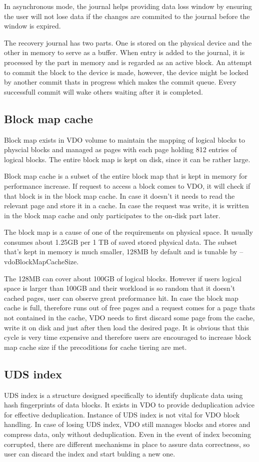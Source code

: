 \documentclass[
  color, %
  table, %
  lof,   %
  lot,   %
]{fithesis3}
\begin{document}
In asynchronous mode, the journal helps providing data loss window by ensuring the user will not lose data if the changes are commited to the journal before the window is expired.

The recovery journal has two parts. One is stored on the physical device and the other in memory to serve as a buffer. When entry is added to the journal, it is processed by the part in memory and is regarded as an active block. An attempt to commit the block to the device is made, however, the device might be locked by another commit thats in progress which makes the commit queue. Every successfull commit will wake others waiting after it is completed.


\subsection{Block map cache}
Block map exists in VDO volume to maintain the mapping of logical blocks to physcial blocks and managed as pages with each page holding 812 entries of logical blocks. The entire block map is kept on disk, since it can be rather large.

Block map cache is a subset of the entire block map that is kept in memory for performance increase. If request to access a block comes to VDO, it will check if that block is in the block map cache. In case it doesn't it needs to read the relevant page and store it in a cache. In case the request was write, it is written in the block map cache and only participates to the on-disk part later.

The block map is a cause of one of the requirements on physical space. It usually consumes about 1.25GB per 1 TB of saved stored physical data. The subset that's kept in memory is much smaller, 128MB by default and is tunable by --vdoBlockMapCacheSize.

The 128MB can cover about 100GB of logical blocks. However if users logical space is larger than 100GB and their workload is so random that it doesn't cached pages, user can observe great preformance hit. In case the block map cache is full, therefore runs out of free pages and a request comes for a page thats not contained in the cache, VDO needs to first discard some page from the cache, write it on disk and just after then load the desired page. It is obvious that this cycle is very time expensive and therefore users are encouraged to increase block map cache size if the precoditions for cache tiering are met.


\subsection{UDS index}
UDS index is a structure designed specifically to identify duplicate data using hash fingerprints of data blocks. It exists in VDO to provide deduplication advice for effective deduplication. Instance of UDS index is not vital for VDO block handling. In case of losing UDS index, VDO still manages blocks and stores and compress data, only without deduplication. Even in the event of index becoming corrupted, there are different mechanisms in place to assure data correctness, so user can discard the index and start bulding a new one.
\end{document}
